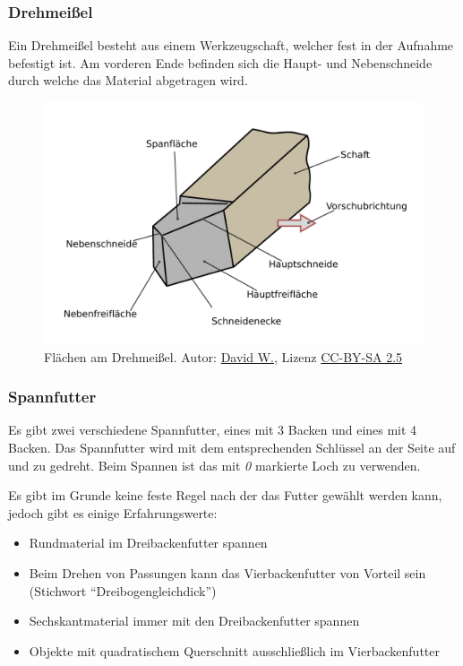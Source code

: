 \documentclass{\basedir/fablab-document}
\begin{document}
\newpage
\subsubsection{Drehmeißel}
Ein Drehmeißel besteht aus einem Werkzeugschaft, welcher fest in der Aufnahme befestigt ist. Am vorderen Ende befinden sich die Haupt- und Nebenschneide durch welche das Material
abgetragen wird.
\begin{figure}[ht]
\centering
\includegraphics[width = 0.75\linewidth]{img/drehmeissel}
\caption{Flächen am Drehmeißel. Autor: \href{http://commons.wikimedia.org/wiki/File:Flaechen_am_Schneidkeil.svg}{David W.}, Lizenz \href{http://creativecommons.org/licenses/by-sa/2.5}{CC-BY-SA 2.5}}
\end{figure}

\subsubsection{Spannfutter}

Es gibt zwei verschiedene Spannfutter, eines mit 3 Backen und eines mit 4 Backen. Das Spannfutter wird mit dem entsprechenden Schlüssel an der Seite auf und zu gedreht. Beim Spannen ist das mit \emph{0} markierte Loch zu verwenden.

Es gibt im Grunde keine feste Regel nach der das Futter gewählt werden kann, jedoch gibt es einige Erfahrungswerte:
\begin{itemize} 
\item Rundmaterial im Dreibackenfutter spannen
\item Beim Drehen von Passungen kann das Vierbackenfutter von Vorteil sein (Stichwort \enquote{Dreibogengleichdick})
\item Sechskantmaterial immer mit den Dreibackenfutter spannen
\item Objekte mit quadratischem Querschnitt ausschließlich im Vierbackenfutter
\end{itemize}
\end{document}
